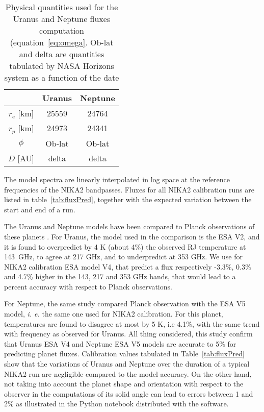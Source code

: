 \begin{table}[ht]
\begin{center}
\begin{tabular}{|c|c|c|}
\hline
     & Uranus & Neptune \\
\hline
$r_{e}$ [km]  & 25559 & 24764 \\ 
\hline
$r_{p}$ [km]  & 24973 & 24341  \\
\hline
$\phi$         & Ob-lat & Ob-lat \\
\hline
$D$   [AU]    & delta   & delta \\
\hline
\end{tabular}
\end{center}
\caption[Primary calibrator flux models]{Physical quantities used for the Uranus and Neptune fluxes
  computation (equation~\ref{eq:omega}. Ob-lat and delta are quantities 
  tabulated by NASA Horizons system \cite{NASAHorizon} as a function of the date}
\label{tab:planetphysparam}
\end{table}


The model spectra are linearly interpolated in log space at the
reference frequencies of the NIKA2 bandpasses. Fluxes for all NIKA2
calibration runs are listed in table~\ref{tab:fluxPred}, together with
the expected variation between the start and end of a run. 

The Uranus and Neptune models have been compared to Planck
observations of these planets \cite{PLCK-LII}. For Uranus, the model used in the comparison
is the ESA V2, and it is found to overpredict by 4 K (about 4\%) the
observed RJ temperature at 143~GHz, to agree at 217 GHz, and
to underpredict at 353 GHz. We use for NIKA2 calibration ESA model V4,
that predict a flux respectively -3.3\%, 0.3\% and 4.7\% higher in the
143, 217 and 353 GHz bands, that would lead to a percent
accuracy with respect to Planck observations. 

For Neptune, the same study compared Planck observation with the ESA V5
model, {\it i. e.} the same one used for NIKA2 calibration. For this
planet, temperatures are found to disagree at most by 5 K, i.e 4.1\%,
with the same trend with frequency as observed for Uranus. All thing
considered, this study confirm that Uranus ESA V4 and Neptune ESA V5
models are accurate to 5\% for predicting planet fluxes. Calibration
values tabulated in Table~\ref{tab:fluxPred} show that the variations
of Uranus and Neptune over the duration of a typical NIKA2 run are
negligible compared to the model accuracy. On the other hand, not
taking into account the planet shape and orientation with respect to
the observer in the computations of its solid angle can lead to errors
between 1 and 2\% as illustrated in the Python notebook
\cite{gith-Haussel-Note}
distributed with the software. 




